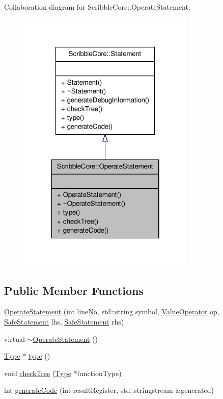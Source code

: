 Collaboration diagram for Scribble\-Core\-:\-:Operate\-Statement\-:
\nopagebreak
\begin{figure}[H]
\begin{center}
\leavevmode
\includegraphics[width=238pt]{class_scribble_core_1_1_operate_statement__coll__graph}
\end{center}
\end{figure}
\subsection*{Public Member Functions}
\begin{DoxyCompactItemize}
\item 
\hyperlink{class_scribble_core_1_1_operate_statement_aeaa7a8e70841591749c313980e7ef134}{Operate\-Statement} (int line\-No, std\-::string symbol, \hyperlink{namespace_scribble_core_ac3cb4bd4d00c910d9e36cf90a521a1d9}{Value\-Operator} op, \hyperlink{namespace_scribble_core_a2ad5bf236bc9164cb56f564685f15a11}{Safe\-Statement} lhs, \hyperlink{namespace_scribble_core_a2ad5bf236bc9164cb56f564685f15a11}{Safe\-Statement} rhs)
\item 
virtual \hyperlink{class_scribble_core_1_1_operate_statement_a6ddb1fbe1dcf19939975b71a47a1b172}{$\sim$\-Operate\-Statement} ()
\item 
\hyperlink{class_scribble_core_1_1_type}{Type} $\ast$ \hyperlink{class_scribble_core_1_1_operate_statement_a1b5522b9d5b626de71a61a7538646a23}{type} ()
\item 
void \hyperlink{class_scribble_core_1_1_operate_statement_ac89a46ee8331ba0afa3ff86ae7a5c94e}{check\-Tree} (\hyperlink{class_scribble_core_1_1_type}{Type} $\ast$function\-Type)
\item 
int \hyperlink{class_scribble_core_1_1_operate_statement_a2bb1867e6502a5118d580f803dd82e40}{generate\-Code} (int result\-Register, std\-::stringstream \&generated)
\end{DoxyCompactItemize}


